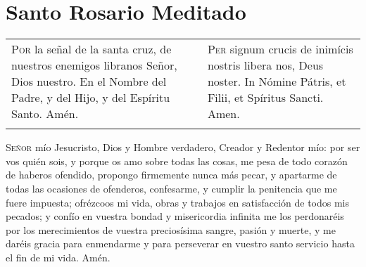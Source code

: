 \documentclass[./main.tex]{subfiles}
\begin{document}
\chapter*{Santo Rosario Meditado}

\begin{longtable} { p{} p{} }
      \label{crossSignal}
      \textsc{Por} la señal de la santa cruz, de nuestros enemigos libranos Señor, Dios nuestro. En el Nombre del Padre,
      y del Hijo, y del Espíritu Santo. Amén.
          &
      \textsc{Per} signum crucis de inimícis nostris libera nos, Deus noster. In Nómine Pátris, et Filii, et Spíritus Sancti. Amen.\\\\
\end{longtable}

\label{contrition}
\textsc{Señor} mío Jesucristo, Dios y Hombre verdadero, Creador y Redentor mío: por ser vos quién sois, y porque os amo sobre todas las cosas,
me pesa de todo corazón de haberos ofendido, propongo firmemente nunca más pecar, y apartarme de todas las ocasiones de ofenderos,
confesarme, y cumplir la penitencia que me fuere impuesta; ofrézcoos mi vida, obras y trabajos en satisfacción de todos mis pecados;
y confío en vuestra bondad y misericordia infinita me los perdonaréis por los merecimientos de vuestra preciosísima sangre, pasión y muerte,
y me daréis gracia para enmendarme y para perseverar en vuestro santo servicio hasta el fin de mi vida. Amén.
\end{document}
